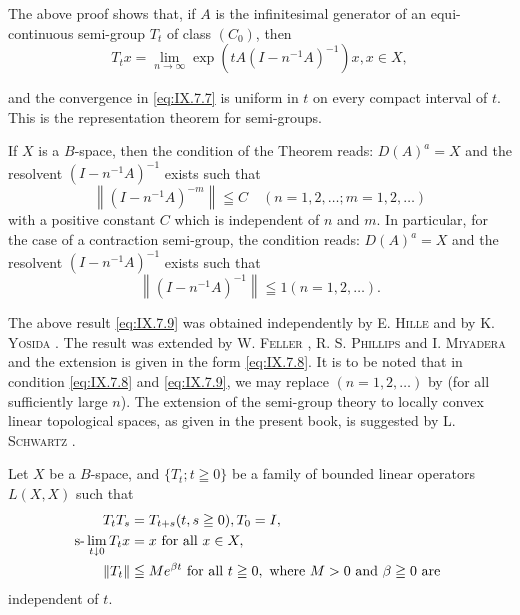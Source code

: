 \begin{remarku} The above proof shows that, if $A$ is the infinitesimal generator of an equi-continuous semi-group $T_{t}$ of class $(C_{0})$, then 
\begin{equation}\label{eq:IX.7.7}
T _{t} x = \lim\limits _{n \rightarrow \infty} \exp (t A (I - n ^{-1} A) ^{-1}) x, x \in X,
\end{equation}
\end{remarku}

and the convergence in \eqref{eq:IX.7.7} is uniform in $t$ on every compact interval of $t$. This is the representation theorem for semi-groups. 

\begin{corollary}\label{cor:IX.7.Corollary.1} If $X$ is a $B$-space, then the condition of the Theorem reads: $D(A)^{a} = X$ and the resolvent $(I - n^{-1}A)^{-1}$ exists such that 
\begin{equation}\label{eq:IX.7.8}
\left\| (I - n ^{-1} A) ^{-m} \right\| \leqq C \quad (n = 1, 2, \dots ; m = 1, 2, \dots)
\end{equation}
with a positive constant $C$ which is independent of $n$ and $m$. In particular, for the case of a contraction semi-group, the condition reads: $D(A)^{a} = X$ and the resolvent $(I - n^{-1}A)^{-1}$ exists such that 
\begin{equation}\label{eq:IX.7.9}
\left\| (I - n ^{-1} A) ^{-1} \right\| \leqq 1 (n = 1, 2, \dots).
\end{equation}
\end{corollary}

\begin{remarku} The above result \eqref{eq:IX.7.9} was obtained independently by E. \textsc{Hille} \cite{hille98} and by K. \textsc{Yosida} \cite{yosida348}. The result was extended by W. \textsc{Feller} \cite{erdelyi56}, R. S. \textsc{Phillips} \cite{phillips253} and I. \textsc{Miyadera} \cite{miyadera204} and the extension is given in the form \eqref{eq:IX.7.8}. It is to be noted that in condition \eqref{eq:IX.7.8} and \eqref{eq:IX.7.9}, we may replace $(n=1,2,\ldots)$ by (for all sufficiently large $n$). The extension of the semi-group theory to locally convex linear topological spaces, as given in the present book, is suggested by L. \textsc{Schwartz} \cite{schwartz296}. 
\end{remarku}

\begin{corollary}\label{cor:IX.7.Corollary.2} Let $X$ be a $B$-space, and $\{T_{t}; t \geqq 0\}$ be a family of bounded linear operators $L(X, X)$ such that 
\begin{align}
T _{t} T _{s}& = T _{t+s} (t, s \geqq 0), T _{0} = I, \label{eq:IX.7.10} \\
\text{s-}\lim _{t \downarrow 0} T _{t} x& = x \text{ for all } x \in X, \label{eq:IX.7.11} \\
\left\| T _{t} \right\|& \leqq M e ^{\beta t} \text{ for all } t \geqq 0, \text{ where } M > 0 \text{ and } \beta \geqq 0 \text{ are } \label{eq:IX.7.12}
\end{align}
independent of $t$. 
\end{corollary}


